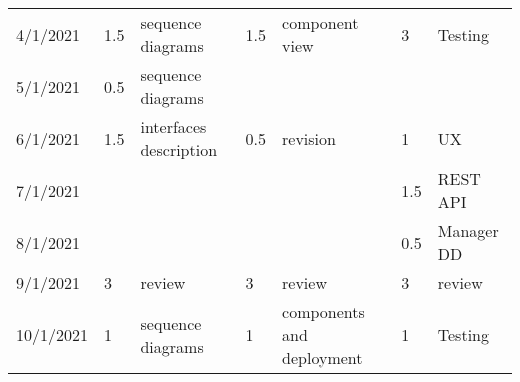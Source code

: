 \begin{table}[H]
\begin{tabular}{|l|l|p{2.5cm}|l|p{2.5cm}|l|p{2.5cm}|}
        4/1/2021   & 1.5   & sequence diagrams      & 1.5   & component view                 & 3      & Testing                 \\
        5/1/2021   & 0.5   & sequence diagrams      &       &                                &        &                         \\
        6/1/2021   & 1.5   & interfaces description & 0.5   & revision                       & 1      & UX                      \\
        7/1/2021   &       &                        &       &                                & 1.5    & REST API                \\
        8/1/2021   &       &                        &       &                                & 0.5    & Manager DD              \\
        9/1/2021   & 3     & review                 & 3     & review                         & 3      & review                  \\
        10/1/2021  & 1     & sequence diagrams      & 1     & components and deployment      & 1      & Testing                 \\
        \hline
    \end{tabular}
    \end{table}
